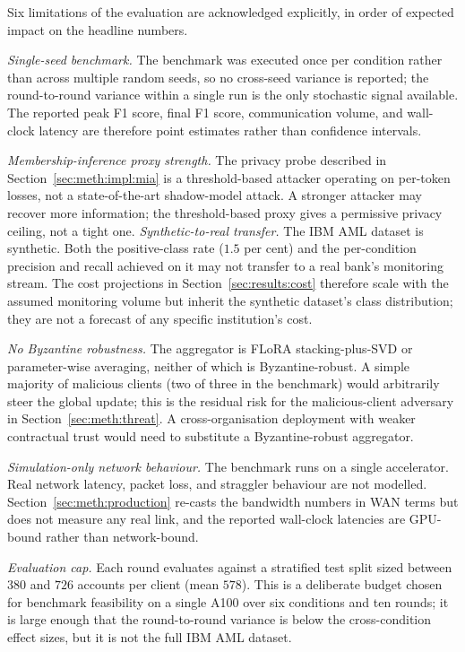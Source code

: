 \documentclass{report}
\begin{document}
Six limitations of the evaluation are acknowledged explicitly, in order of expected impact on the headline numbers.

\textit{Single-seed benchmark.} The benchmark was executed once per condition rather than across multiple random seeds, so no cross-seed variance is reported; the round-to-round variance within a single run is the only stochastic signal available. The reported peak F1 score, final F1 score, communication volume, and wall-clock latency are therefore point estimates rather than confidence intervals.

\textit{Membership-inference proxy strength.} The privacy probe described in Section~\ref{sec:meth:impl:mia} is a threshold-based attacker operating on per-token losses, not a state-of-the-art shadow-model attack. A stronger attacker may recover more information; the threshold-based proxy gives a permissive privacy ceiling, not a tight one. 
\textit{Synthetic-to-real transfer.} The IBM AML dataset is synthetic. Both the positive-class rate ($1.5$ per cent) and the per-condition precision and recall achieved on it may not transfer to a real bank's monitoring stream. The cost projections in Section~\ref{sec:results:cost} therefore scale with the assumed monitoring volume but inherit the synthetic dataset's class distribution; they are not a forecast of any specific institution's cost.

\textit{No Byzantine robustness.} The aggregator is FLoRA stacking-plus-SVD or parameter-wise averaging, neither of which is Byzantine-robust. A simple majority of malicious clients (two of three in the benchmark) would arbitrarily steer the global update; this is the residual risk for the malicious-client adversary in Section~\ref{sec:meth:threat}. A cross-organisation deployment with weaker contractual trust would need to substitute a Byzantine-robust aggregator.

\textit{Simulation-only network behaviour.} The benchmark runs on a single accelerator. Real network latency, packet loss, and straggler behaviour are not modelled. Section~\ref{sec:meth:production} re-casts the bandwidth numbers in WAN terms but does not measure any real link, and the reported wall-clock latencies are GPU-bound rather than network-bound.

\textit{Evaluation cap.} Each round evaluates against a stratified test split sized between $380$ and $726$ accounts per client (mean $578$). This is a deliberate budget chosen for benchmark feasibility on a single A100 over six conditions and ten rounds; it is large enough that the round-to-round variance is below the cross-condition effect sizes, but it is not the full IBM AML dataset.
\end{document}
